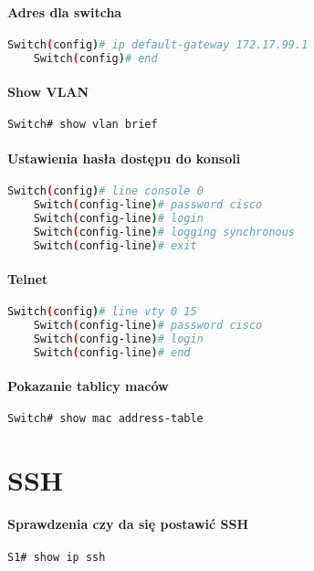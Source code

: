 \documentclass[12pt]{article}
\begin{document}
	\paragraph{Adres dla switcha}
	\begin{lstlisting}[language=bash]
	Switch(config)# ip default-gateway 172.17.99.1
	Switch(config)# end
	\end{lstlisting}
		
	\paragraph{Show VLAN}
	\begin{lstlisting}[language=bash]
	Switch# show vlan brief
	\end{lstlisting}
		
	\paragraph{Ustawienia hasła dostępu do konsoli}
	\begin{lstlisting}[language=bash]	
	Switch(config)# line console 0
	Switch(config-line)# password cisco
	Switch(config-line)# login
	Switch(config-line)# logging synchronous 
	Switch(config-line)# exit
	\end{lstlisting}
		
	\paragraph{Telnet}
	\begin{lstlisting}[language=bash]	
	Switch(config)# line vty 0 15
	Switch(config-line)# password cisco
	Switch(config-line)# login
	Switch(config-line)# end
	\end{lstlisting}
		
	\paragraph{Pokazanie tablicy maców}
	\begin{lstlisting}[language=bash]	
	Switch# show mac address-table
	\end{lstlisting}
	
\newpage

\section{SSH}
	\paragraph{Sprawdzenia czy da się postawić SSH}
	\begin{lstlisting}[language=bash]	
	S1# show ip ssh
	\end{lstlisting}
		
\end{document}

